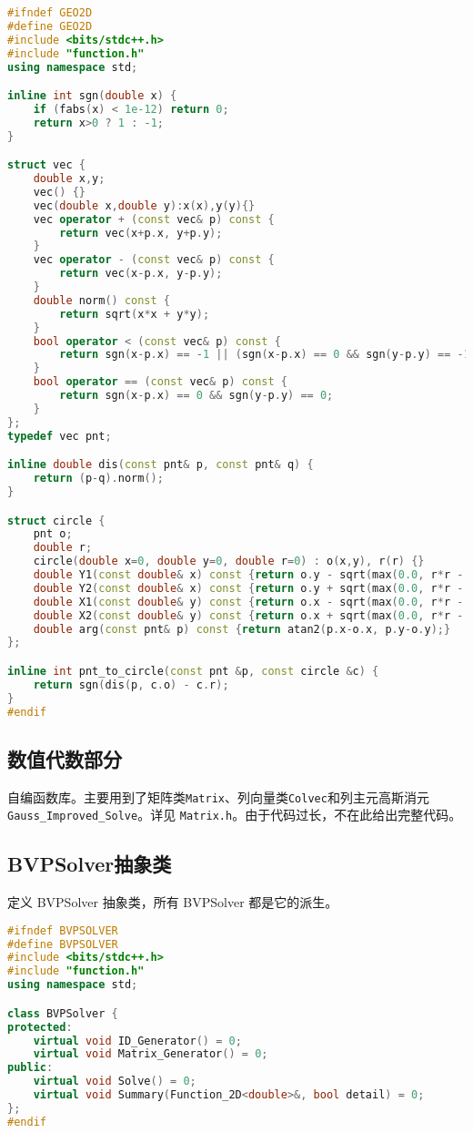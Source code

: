 \documentclass{ctexart}
\begin{document}
\begin{lstlisting}[language={c++}]
#ifndef GEO2D
#define GEO2D
#include <bits/stdc++.h>
#include "function.h"
using namespace std;

inline int sgn(double x) {
	if (fabs(x) < 1e-12) return 0;
	return x>0 ? 1 : -1;
}

struct vec {
	double x,y;
	vec() {}
	vec(double x,double y):x(x),y(y){}
	vec operator + (const vec& p) const {
		return vec(x+p.x, y+p.y);
	}
	vec operator - (const vec& p) const {
		return vec(x-p.x, y-p.y);
	}
	double norm() const {
		return sqrt(x*x + y*y);
	}
	bool operator < (const vec& p) const {
		return sgn(x-p.x) == -1 || (sgn(x-p.x) == 0 && sgn(y-p.y) == -1);
	}
	bool operator == (const vec& p) const {
		return sgn(x-p.x) == 0 && sgn(y-p.y) == 0;
	}
};
typedef vec pnt;

inline double dis(const pnt& p, const pnt& q) {
	return (p-q).norm();
}

struct circle {
	pnt o;
	double r;
	circle(double x=0, double y=0, double r=0) : o(x,y), r(r) {}
	double Y1(const double& x) const {return o.y - sqrt(max(0.0, r*r - (x-o.x)*(x-o.x)));}
	double Y2(const double& x) const {return o.y + sqrt(max(0.0, r*r - (x-o.x)*(x-o.x)));}
	double X1(const double& y) const {return o.x - sqrt(max(0.0, r*r - (y-o.y)*(y-o.y)));}
	double X2(const double& y) const {return o.x + sqrt(max(0.0, r*r - (y-o.y)*(y-o.y)));}
	double arg(const pnt& p) const {return atan2(p.x-o.x, p.y-o.y);}
};

inline int pnt_to_circle(const pnt &p, const circle &c) {
	return sgn(dis(p, c.o) - c.r);
}
#endif
\end{lstlisting}

\subsection{数值代数部分}

自编函数库。主要用到了矩阵类\verb|Matrix|、列向量类\verb|Colvec|和列主元高斯消元\verb|Gauss_Improved_Solve|。详见 \verb|Matrix.h|。由于代码过长，不在此给出完整代码。

\subsection{BVPSolver抽象类}

定义 BVPSolver 抽象类，所有 BVPSolver 都是它的派生。

\begin{lstlisting}[language={c++}]
#ifndef BVPSOLVER
#define BVPSOLVER
#include <bits/stdc++.h>
#include "function.h"
using namespace std;

class BVPSolver {
protected:
	virtual void ID_Generator() = 0;
	virtual void Matrix_Generator() = 0;
public:
	virtual void Solve() = 0;
	virtual void Summary(Function_2D<double>&, bool detail) = 0;
};
#endif
\end{lstlisting}
\end{document}
